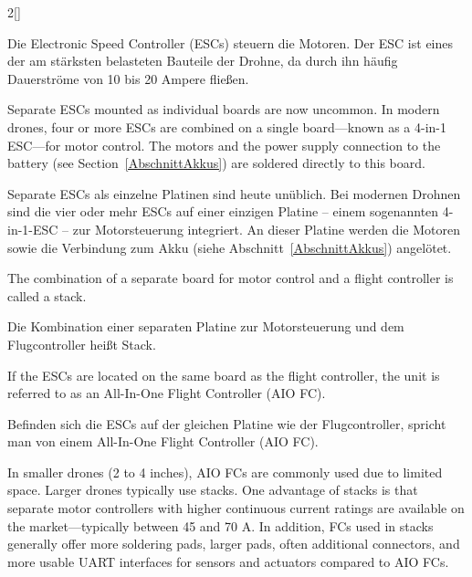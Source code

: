 \begin{paracol}{2}[]
\colger

Die Electronic Speed Controller (ESCs) steuern die Motoren. Der ESC ist eines der am stärksten belasteten Bauteile der Drohne, da durch ihn häufig Dauerströme von 10 bis 20 Ampere fließen.

\coleng

Separate ESCs mounted as individual boards are now uncommon. In modern drones, four or more ESCs are combined on a single board—known as a 4-in-1 ESC—for motor control. The motors and the power supply connection to the battery (see Section~\ref{AbschnittAkkus}) are soldered directly to this board.

\colger

Separate ESCs als einzelne Platinen sind heute unüblich. Bei modernen Drohnen sind die vier oder mehr ESCs auf einer einzigen Platine -- einem sogenannten 4-in-1-ESC -- zur Motorsteuerung integriert. An dieser Platine werden die Motoren sowie die Verbindung zum Akku (siehe Abschnitt~\ref{AbschnittAkkus}) angelötet.

\colende

\renewcommand{\deutschertitel}{Stack oder AIO}
\renewcommand{\englischertitel}{Stack or AIO}
\makrounterabschnitt
\label{AbschnittESC}

The combination of a separate board for motor control and a flight controller is called a stack.

\colger

Die Kombination einer separaten Platine zur Motorsteuerung und dem Flugcontroller heißt Stack.

\coleng

If the ESCs are located on the same board as the flight controller, the unit is referred to as an All-In-One Flight Controller (AIO FC).

\colger

Befinden sich die ESCs auf der gleichen Platine wie der Flugcontroller, spricht man von einem All-In-One Flight Controller (AIO FC).

\coleng

In smaller drones (2 to 4 inches), AIO FCs are commonly used due to limited space. Larger drones typically use stacks. One advantage of stacks is that separate motor controllers with higher continuous current ratings are available on the market—typically between 45 and 70 A. In addition, FCs used in stacks generally offer more soldering pads, larger pads, often additional connectors, and more usable UART interfaces for sensors and actuators compared to AIO FCs.


\end{paracol}

